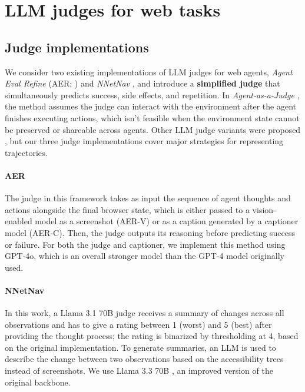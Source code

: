\documentclass{article} %
\begin{document}
\section{LLM judges for web tasks}
\label{sec:llm_judges}

\subsection{Judge implementations}
\label{sec:judge_existing_implementations}

We consider two existing implementations of LLM judges for web agents, \textit{Agent Eval Refine} (AER; \citealt{AER_pan2024}) and \textit{NNetNav} \citep{nnetnav_murty2025}, and introduce a \textbf{simplified judge} that simultaneously predicts success, side effects, and repetition. In \textit{Agent-as-a-Judge} \citep{zhuge2024agentasajudgeevaluateagentsagents}, the method assumes the judge can interact with the environment after the agent finishes executing actions, which isn’t feasible when the environment state cannot be preserved or shareable across agents. Other LLM judge variants were proposed \citep{He2024WebVoyagerBA,AgentQ_2024,autowebglm,insta_trabucco2025}, but our three judge implementations cover major strategies for representing trajectories.

\paragraph{AER \citep{AER_pan2024}}
The judge in this framework takes as input the sequence of agent thoughts and actions alongside the final browser state, which is either passed to a vision-enabled model as a screenshot (AER-V) or as a caption generated by a captioner model (AER-C). Then, the judge outputs its reasoning before predicting success or failure. For both the judge and captioner, we implement this method using GPT-4o, which is an overall stronger model than the GPT-4 \citep{openai2024gpt4technicalreport} model originally used.

\paragraph{NNetNav \citep{nnetnav_murty2025}}
In this work, a Llama 3.1 70B judge receives a summary of changes across all observations and has to give a rating between 1 (worst) and 5 (best) after providing the thought process; the rating is binarized by thresholding at 4, based on the original implementation. To generate summaries, an LLM is used to describe the change between two observations based on the accessibility trees instead of screenshots. We use Llama 3.3 70B \citep{future_of_ai_llama}, an improved version of the original backbone.
\end{document}
